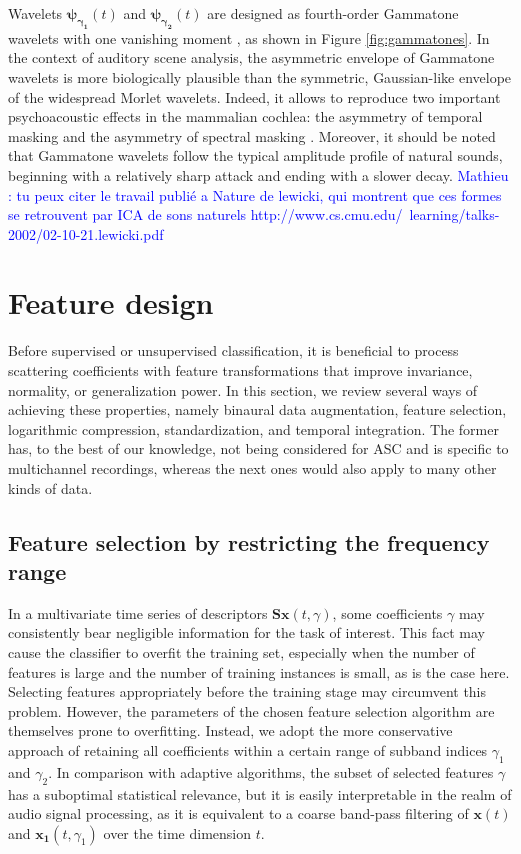 \documentclass[journal]{IEEEtran}
\newcommand{\ml}[1]{\textcolor{blue}{ Mathieu : #1}}
\begin{document}
Wavelets
$\boldsymbol{\psi_{\gamma_1}}(t)$ and $\boldsymbol{\psi_{\gamma_2}}(t)$ are designed as fourth-order Gammatone
wavelets with one vanishing moment \cite{Venkitaraman2014}, as shown in Figure \ref{fig:gammatones}.
In the context of auditory scene analysis, the asymmetric envelope of Gammatone wavelets is more biologically plausible than the symmetric, Gaussian-like envelope of the widespread Morlet wavelets.
Indeed, it allows to reproduce two important psychoacoustic effects in the mammalian cochlea: the asymmetry of temporal masking and the asymmetry of spectral masking \cite{Fastl2007}.
Moreover, it should be noted that Gammatone wavelets follow the typical amplitude profile of natural sounds, beginning with a relatively sharp attack and ending with a slower decay. \ml{tu peux citer le travail publié a Nature de lewicki, qui montrent que ces formes se retrouvent par ICA de sons naturels http://www.cs.cmu.edu/~learning/talks-2002/02-10-21.lewicki.pdf}


\section{Feature design}
Before supervised or unsupervised classification, it is beneficial to process scattering coefficients with feature transformations that improve invariance, normality, or generalization power. 
In this section, we review several ways of achieving these properties, namely binaural data augmentation, feature selection, logarithmic compression, standardization, and temporal integration.
The former has, to the best of our knowledge, not being considered for ASC and is specific to multichannel recordings, whereas the next ones would also apply to many other kinds of data.

\subsection{Feature selection by restricting the frequency range}
In a multivariate time series of descriptors $\mathbf{S}\boldsymbol{x}(t,\gamma)$, some coefficients $\gamma$ may consistently bear negligible information for the task of interest.
This fact may cause the classifier to overfit the training set, especially when the number of features is large and the number of training instances is small, as is the case here.
Selecting features appropriately before the training stage may circumvent this problem.
However, the parameters of the chosen feature selection algorithm are themselves prone to overfitting.
Instead, we adopt the more conservative approach of retaining all coefficients within a certain range of subband indices $\gamma_1$ and $\gamma_2$.
In comparison with adaptive algorithms, the subset of selected features $\gamma$ has a suboptimal statistical relevance, but it is easily interpretable in the realm of audio signal processing, as it is equivalent to a coarse band-pass filtering of $\boldsymbol{x}(t)$ and $\boldsymbol{x_1}(t,\gamma_1)$ over the time dimension $t$.
\end{document}
